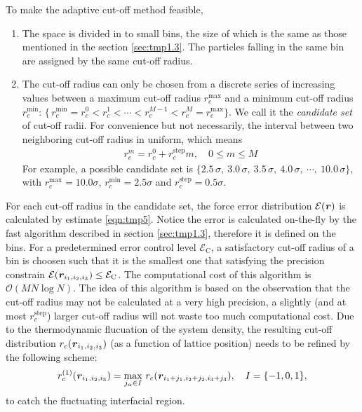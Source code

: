 \documentclass[aps,pre,preprint]{revtex4}
\renewcommand{\v}[1]{\textbf{\textit{#1}}}
\begin{document}
To make the adaptive cut-off method feasible,
\begin{enumerate}
\item The space is divided in to small bins, the size of which is the
  same as those mentioned in the section \ref{sec:tmp1.3}.  The
  particles falling in the same bin are assigned by the same cut-off
  radius.
\item The cut-off radius can only be chosen from a discrete series of
  increasing values between a maximum cut-off radius
  $r_c^{\textrm{max}}$ and a minimum cut-off radius
  $r_c^{\textrm{min}}$: $\{\,r_c^{\textrm{min}} = r_c^0 < r_c^1 <
  \cdots < r_c^{M-1} <r_c^M = r_c^{\textrm{max}}\}$.  We call it the
  \emph{candidate set} of cut-off radii.  For convenience but not
  necessarily, the interval between two neighboring cut-off radius in
  uniform, which means
  \begin{align}
    r_c^m = r_c^0 + r_c^{\textrm{step}} m, \quad 0 \leq m \leq M
  \end{align}
  For example, a possible candidate set is $\{2.5\,\sigma,\
  3.0\,\sigma,\ 3.5\,\sigma,\ 4.0\,\sigma,\ \cdots,\ 10.0\,\sigma\}$,
  with $r_c^{\textrm{max}} = 10.0\sigma$, $r_c^{\textrm{min}} =
  2.5\sigma$ and $r_c^{\textrm{step}} = 0.5 \sigma$.
\end{enumerate}
For each cut-off radius in the candidate set, the force error
distribution $\mathcal E(\v r)$ is calculated by estimate
\eqref{eqn:tmp5}. Notice the error is calculated on-the-fly by the
fast algorithm described in section \ref{sec:tmp1.3}, therefore it is
defined on the bins.  For a predetermined error control level
$\mathcal E_{\textrm{C}}$, a satisfactory cut-off radius of a bin is
choosen such that it is the smallest one that satisfying the precision
constrain $\mathcal E(\v r_{i_1,i_2,i_3}) \leq \mathcal
E_{\textrm{C}}$. The computational cost of this algorithm is $\mathcal
O(MN\log N)$.  The idea of this algorithm is based on the observation
that the cut-off radius may not be calculated at a very high
precision, a slightly (and at most $r_c^{\textrm{step}}$) larger
cut-off radius will not waste too much computational cost.  Due to the
thermodynamic flucuation of the system density, the resulting cut-off
distribution $r_c(\v r_{i_1,i_2,i_3})$ (as a function of lattice
position) needs to be refined by the following scheme:
\begin{align}\label{eqn:rc-refine}
  r^{(1)}_c(\v r_{i_1,i_2,i_3}) = \max_{j_\alpha\in I}\,r_c(\v r_{i_1+j_1,i_2+j_2,i_3+j_3}),
  \quad I = \{-1, 0, 1\},
\end{align}
to catch the fluctuating interfacial region.
\end{document}
